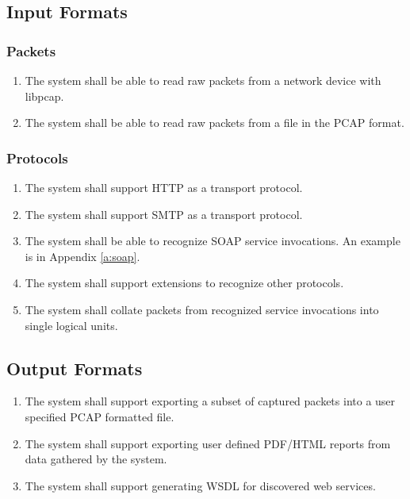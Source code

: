 \documentclass[titlepage]{article}
\begin{document}

\subsection{Input Formats%
  \label{input-formats}%
}

\subsubsection{Packets}
\begin{enumerate}
    \item The system shall be able to read raw packets from a network device
        with libpcap.
    \item The system shall be able to read raw packets from a file in the PCAP
        format.
\end{enumerate}

\subsubsection{Protocols}
\begin{enumerate}
    \item The system shall support HTTP as a transport protocol.
    \item The system shall support SMTP as a transport protocol.
    \item The system shall be able to recognize SOAP service invocations.  An
        example is in Appendix \ref{a:soap}.
    \item The system shall support extensions to recognize other protocols.
    \item The system shall collate packets from recognized service invocations
        into single logical units.
\end{enumerate}


\subsection{Output Formats%
  \label{output-formats}%
}

\begin{enumerate}
    \item The system shall support exporting a subset of captured packets into
        a user specified PCAP formatted file.
    \item The system shall support exporting user defined PDF/HTML reports from
        data gathered by the system.
    \item The system shall support generating WSDL for discovered web services.
\end{enumerate}
\end{document}
